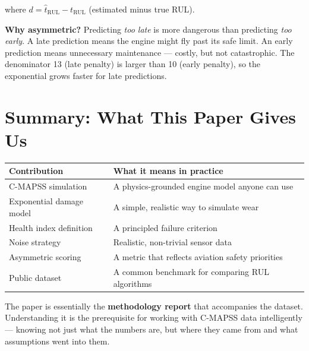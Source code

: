 \documentclass[11pt, a4paper]{article}
\begin{document}
where $d = \hat{t}_\text{RUL} - t_\text{RUL}$ (estimated minus true RUL).

\begin{keybox}
\textbf{Why asymmetric?}
Predicting \emph{too late} is more dangerous than predicting
\emph{too early}. A late prediction means the engine might fly past
its safe limit. An early prediction means unnecessary maintenance ---
costly, but not catastrophic. The denominator 13 (late penalty)
is larger than 10 (early penalty), so the exponential grows faster
for late predictions.
\end{keybox}

\section{Summary: What This Paper Gives Us}

\begin{center}
\begin{tabular}{@{}lp{9cm}@{}}
  \toprule
  Contribution & What it means in practice \\
  \midrule
  C-MAPSS simulation  & A physics-grounded engine model anyone can use \\
  Exponential damage model & A simple, realistic way to simulate wear \\
  Health index definition & A principled failure criterion \\
  Noise strategy & Realistic, non-trivial sensor data \\
  Asymmetric scoring & A metric that reflects aviation safety priorities \\
  Public dataset & A common benchmark for comparing RUL algorithms \\
  \bottomrule
\end{tabular}
\end{center}

\bigskip
The paper is essentially the \textbf{methodology report} that accompanies
the dataset. Understanding it is the prerequisite for working with
C-MAPSS data intelligently --- knowing not just what the numbers are,
but where they came from and what assumptions went into them.

\end{document}
